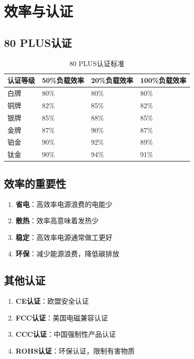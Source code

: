 \documentclass[12pt,UTF8]{ctexbook}
\begin{document}
\chapter{效率与认证}

\section{80 PLUS认证}

\begin{table}[H]
    \centering
    \begin{tabular}{|p{2cm}|p{3cm}|p{3cm}|p{3cm}|}
        \hline
        \textbf{认证等级} & \textbf{50\%负载效率} & \textbf{20\%负载效率} & \textbf{100\%负载效率} \\
        \hline
        白牌 & 80\% & 80\% & 80\% \\
        \hline
        铜牌 & 82\% & 85\% & 82\% \\
        \hline
        银牌 & 85\% & 88\% & 85\% \\
        \hline
        金牌 & 87\% & 90\% & 87\% \\
        \hline
        铂金 & 90\% & 92\% & 89\% \\
        \hline
        钛金 & 90\% & 94\% & 91\% \\
        \hline
    \end{tabular}
    \caption{80 PLUS认证标准}
    \label{tab:80plus_certification}
\end{table}

\section{效率的重要性}

\begin{enumerate}
    \item \textbf{省电}：高效率电源浪费的电能少
    \item \textbf{散热}：效率高意味着发热少
    \item \textbf{稳定}：高效率电源通常做工更好
    \item \textbf{环保}：减少能源浪费，降低碳排放
\end{enumerate}

\section{其他认证}

\begin{enumerate}
    \item \textbf{CE认证}：欧盟安全认证
    \item \textbf{FCC认证}：美国电磁兼容认证
    \item \textbf{CCC认证}：中国强制性产品认证
    \item \textbf{ROHS认证}：环保认证，限制有害物质
\end{enumerate}
\end{document}
